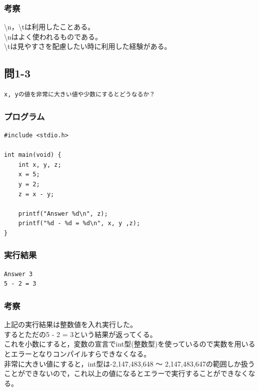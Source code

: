 \documentclass{jarticle}
\begin{document}
\subsubsection{考察\\}
\textbackslash{n}，\textbackslash{t}は利用したことある。\\
\textbackslash{n}はよく使われるものである。\\
\textbackslash{t}は見やすさを配慮したい時に利用した経験がある。\\

\subsection{問1-3\\}
\begin{verbatim}
x, yの値を非常に大きい値や少数にするとどうなるか？
\end{verbatim}
\subsubsection{プログラム\\}
\begin{breakbox}
\begin{verbatim}
#include <stdio.h>

int main(void) {
	int x, y, z;
	x = 5;
	y = 2;
	z = x - y;
	
	printf("Answer %d\n", z);
	printf("%d - %d = %d\n", x, y ,z);
}
\end{verbatim}
\end{breakbox}
\subsubsection{実行結果\\}
\begin{breakbox}
\begin{verbatim}
Answer 3
5 - 2 = 3
\end{verbatim}
\end{breakbox}
\subsubsection{考察\\}
上記の実行結果は整数値を入れ実行した。\\
するとただの5 - 2 = 3という結果が返ってくる。\\
これを小数にすると，変数の宣言でint型(整数型)を使っているので実数を用いるとエラーとなりコンパイルすらできなくなる。\\
非常に大きい値にすると，int型は-2,147,483,648 〜 2,147,483,647の範囲しか扱うことができないので，これ以上の値になるとエラーで実行することができなくなる。\\
\end{document}
